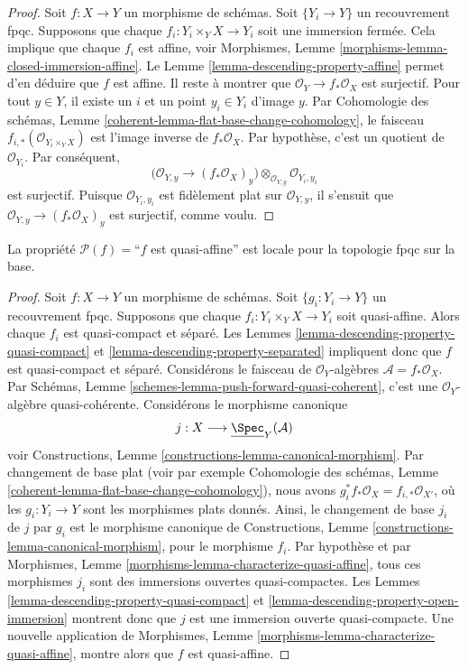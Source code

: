 \begin{proof}
Soit $f : X \to Y$ un morphisme de schémas.
Soit $\{Y_i \to Y\}$ un recouvrement fpqc.
Supposons que chaque $f_i : Y_i \times_Y X \to Y_i$
soit une immersion fermée.
Cela implique que chaque $f_i$ est affine, voir
Morphismes, Lemme \ref{morphisms-lemma-closed-immersion-affine}.
Le Lemme \ref{lemma-descending-property-affine}
permet d'en déduire que $f$ est affine. Il reste à montrer que
$\mathcal{O}_Y \to f_*\mathcal{O}_X$ est surjectif.
Pour tout $y \in Y$, il existe un $i$ et un point
$y_i \in Y_i$ d'image $y$.
Par Cohomologie des schémas,
Lemme \ref{coherent-lemma-flat-base-change-cohomology},
le faisceau $f_{i, *}(\mathcal{O}_{Y_i \times_Y X})$
est l'image inverse de $f_*\mathcal{O}_X$.
Par hypothèse, c'est un quotient de $\mathcal{O}_{Y_i}$.
Par conséquent,
$$
\Big(
\mathcal{O}_{Y, y} \longrightarrow (f_*\mathcal{O}_X)_y
\Big)
\otimes_{\mathcal{O}_{Y, y}} \mathcal{O}_{Y_i, y_i}
$$
est surjectif. Puisque $\mathcal{O}_{Y_i, y_i}$ est fidèlement
plat sur $\mathcal{O}_{Y, y}$, il s'ensuit que
$\mathcal{O}_{Y, y} \longrightarrow (f_*\mathcal{O}_X)_y$ est surjectif,
comme voulu.
\end{proof}

\begin{lemma}
\label{lemma-descending-property-quasi-affine}
La propriété $\mathcal{P}(f) =$``$f$ est quasi-affine''
est locale pour la topologie fpqc sur la base.
\end{lemma}

\begin{proof}
Soit $f : X \to Y$ un morphisme de schémas.
Soit $\{g_i : Y_i \to Y\}$ un recouvrement fpqc.
Supposons que chaque $f_i : Y_i \times_Y X \to Y_i$
soit quasi-affine.
Alors chaque $f_i$ est quasi-compact et séparé.
Les Lemmes \ref{lemma-descending-property-quasi-compact}
et \ref{lemma-descending-property-separated}
impliquent donc que $f$ est quasi-compact et séparé.
Considérons le faisceau de $\mathcal{O}_Y$-algèbres
$\mathcal{A} = f_*\mathcal{O}_X$.
Par Schémas, Lemme \ref{schemes-lemma-push-forward-quasi-coherent},
c'est une $\mathcal{O}_Y$-algèbre quasi-cohérente.
Considérons le morphisme canonique
$$
j : X \longrightarrow \underline{\Spec}_Y(\mathcal{A})
$$
voir Constructions, Lemme \ref{constructions-lemma-canonical-morphism}.
Par changement de base plat
(voir par exemple Cohomologie des schémas,
Lemme \ref{coherent-lemma-flat-base-change-cohomology}),
nous avons $g_i^*f_*\mathcal{O}_X = f_{i, *}\mathcal{O}_{X'}$,
où les $g_i : Y_i \to Y$ sont les morphismes plats donnés.
Ainsi, le changement de base $j_i$ de $j$ par $g_i$ est le morphisme canonique
de Constructions, Lemme \ref{constructions-lemma-canonical-morphism},
pour le morphisme $f_i$. Par hypothèse et par
Morphismes, Lemme \ref{morphisms-lemma-characterize-quasi-affine},
tous ces morphismes $j_i$ sont des immersions ouvertes quasi-compactes.
Les Lemmes \ref{lemma-descending-property-quasi-compact} et
\ref{lemma-descending-property-open-immersion} montrent donc que
$j$ est une immersion ouverte quasi-compacte.
Une nouvelle application de
Morphismes, Lemme \ref{morphisms-lemma-characterize-quasi-affine},
montre alors que $f$ est quasi-affine.
\end{proof}

